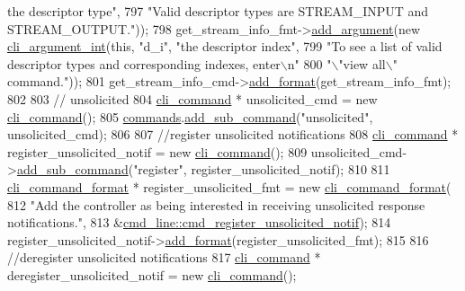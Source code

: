 \begin{DoxyCode}
{      the descriptor type"},
797                                                               \textcolor{stringliteral}{"Valid descriptor types are STREAM\_INPUT and
       STREAM\_OUTPUT."}));
798     get\_stream\_info\_fmt->\hyperlink{classcli__command__format_ac3fc6d13a227c195d5ee6f7b78eba9cd}{add\_argument}(\textcolor{keyword}{new} \hyperlink{classcli__argument__int}{cli\_argument\_int}(\textcolor{keyword}{this}, \textcolor{stringliteral}{"d\_i"}, \textcolor{stringliteral}{"the
       descriptor index"},
799                                                            \textcolor{stringliteral}{"To see a list of valid descriptor types and
       corresponding indexes, enter\(\backslash\)n"}
800                                                            \textcolor{stringliteral}{"\(\backslash\)"view all\(\backslash\)" command."}));
801     get\_stream\_info\_cmd->\hyperlink{classcli__command_aa9ec38e761644d946f8db2b920e39921}{add\_format}(get\_stream\_info\_fmt);
802 
803     \textcolor{comment}{// unsolicited}
804     \hyperlink{classcli__command}{cli\_command} * unsolicited\_cmd = \textcolor{keyword}{new} \hyperlink{classcli__command}{cli\_command}();
805     \hyperlink{classcmd__line_ae4fea670c2fdd2b60f7b5b6ad6fbaf1e}{commands}.\hyperlink{classcli__command_aa73a67e8ebb6facd4b40ced66279b226}{add\_sub\_command}(\textcolor{stringliteral}{"unsolicited"}, unsolicited\_cmd);
806 
807     \textcolor{comment}{//register unsolicited notifications}
808     \hyperlink{classcli__command}{cli\_command} * register\_unsolicited\_notif = \textcolor{keyword}{new} \hyperlink{classcli__command}{cli\_command}();
809     unsolicited\_cmd->\hyperlink{classcli__command_aa73a67e8ebb6facd4b40ced66279b226}{add\_sub\_command}(\textcolor{stringliteral}{"register"}, register\_unsolicited\_notif);
810 
811     \hyperlink{classcli__command__format}{cli\_command\_format} * register\_unsolicited\_fmt = \textcolor{keyword}{new} 
      \hyperlink{classcli__command__format}{cli\_command\_format}(
812         \textcolor{stringliteral}{"Add the controller as being interested in receiving unsolicited response notifications."},
813         &\hyperlink{classcmd__line_a8e9f80a8fd0c927d8b6500d1d5b9f797}{cmd\_line::cmd\_register\_unsolicited\_notif});
814     register\_unsolicited\_notif->\hyperlink{classcli__command_aa9ec38e761644d946f8db2b920e39921}{add\_format}(register\_unsolicited\_fmt);
815 
816     \textcolor{comment}{//deregister unsolicited notifications}
817     \hyperlink{classcli__command}{cli\_command} * deregister\_unsolicited\_notif = \textcolor{keyword}{new} \hyperlink{classcli__command}{cli\_command}();

\end{DoxyCode}
